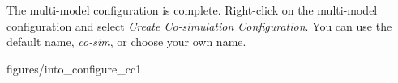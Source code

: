 \documentclass[11pt,a4paper]{../tutorial}
\begin{document}
\begin{instructions}
%
%

%

%

\item The multi-model configuration is complete. Right-click on the multi-model configuration and select \emph{Create Co-simulation Configuration}. You can use the default name, \emph{co-sim}, or choose your own name.

    \begin{annotation}[width=0.85\linewidth,trim=0 0 0 0,clip]{figures/into_configure_cc1}
    \end{annotation}


\end{instructions}
\end{document}
